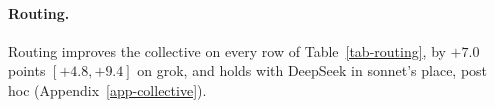 \paragraph{Routing.}
Routing improves the collective on every row of Table~\ref{tab-routing}, by
$+7.0$ points $[+4.8, +9.4]$ on grok, and
holds with DeepSeek in sonnet's place, post hoc
(Appendix~\ref{app-collective}).
